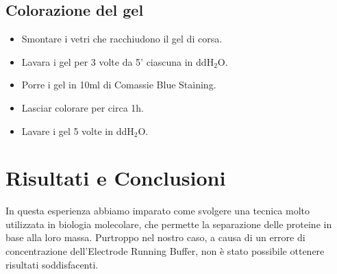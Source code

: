 



\subsection{Colorazione del gel}
\begin{itemize}
\item Smontare i vetri che racchiudono il gel di corsa.
\item Lavara i gel per 3 volte da 5' ciascuna in ddH$_2$O.
\item Porre i gel in 10ml di Comassie Blue Staining.
\item Lasciar colorare per circa 1h.
\item Lavare i gel 5 volte in ddH$_2$O.
\end{itemize}


\section{Risultati e Conclusioni}

In questa esperienza abbiamo imparato come svolgere una tecnica
molto utilizzata in biologia molecolare, che permette la separazione
delle proteine in base alla loro massa.
Purtroppo nel nostro caso, a causa di un errore di concentrazione
dell'Electrode Running Buffer, non \`e stato possibile ottenere
risultati soddisfacenti.

